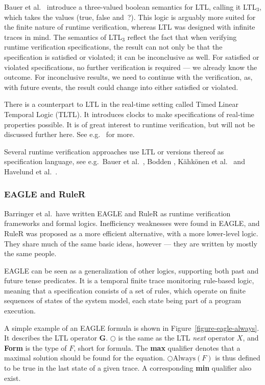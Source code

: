 \documentclass[a4paper,11pt]{kth-mag}
\begin{document}
Bauer et al.\ \cite{bauer06monitoring} introduce a three-valued boolean
semantics for LTL, calling it LTL$_3$, which takes the values (true, false
and~?). This logic is arguably more suited for the finite nature of runtime
verification, whereas LTL was designed with infinite traces in mind. The
semantics of LTL$_3$ reflect the fact that when verifying runtime verification
specifications, the result can not only be that the specification is satisfied
or violated; it can be inconclusive as well. For satisfied or violated
specifications, no further verification is required --- we already know the
outcome. For inconclusive results, we need to continue with the verification,
as, with future events, the result could change into either satisfied or
violated.

There is a counterpart to LTL in the real-time setting called Timed Linear
Temporal Logic (TLTL). It introduces clocks to make specifications
of real-time properties possible. It is of great interest to runtime
verification, but will not be discussed further here. See e.g.\
\cite{bauer06monitoring} for more.

Several runtime verification approaches use LTL or versions thereof as
specification language, see e.g.\ Bauer et al.\
\cite{bauer06monitoring}, Bodden \cite{bodden05efficientrv}, Kähkönen et al.\
\cite{kahkonen09lime} and Havelund et al.\ \cite{havelund04jpax}.

\subsubsection{EAGLE and RuleR}

Barringer et al.\ have written EAGLE \cite{barringer03eagle} and RuleR
\cite{barringer07ruler} as runtime verification frameworks and formal logics.
Inefficiency weaknesses were found in EAGLE, and RuleR was proposed as a more
efficient alternative, with a more lower-level logic. They share much of the
same basic ideas, however --- they are written by mostly the same people.

EAGLE can be seen as a generalization of other logics, supporting both past and
future tense predicates. It is a temporal finite trace monitoring rule-based
logic, meaning that a specification consists of a set of rules, which operate
on finite sequences of states of the system model, each state being part of a
program execution.

A simple example of an EAGLE formula is shown in
Figure~\ref{figure-eagle-always}.
It describes the LTL operator $\boldsymbol{G}$. $\bigcirc$ is the same as the
LTL \textit{next} operator $X$, and \textbf{Form} is the type of $F$, short for
formula. The \textbf{max} qualifier denotes that a maximal solution should be
found for the equation. $\bigcirc \text{Always}(F)$ is thus defined to be true
in the last state of a given trace. A corresponding \textbf{min} qualifier also
exist.
\end{document}
